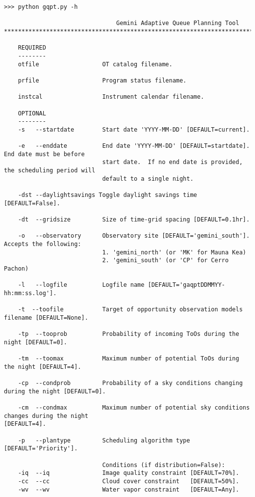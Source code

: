 \documentclass{article}
\begin{document}
\begin{lstlisting}
>>> python gqpt.py -h

                                Gemini Adaptive Queue Planning Tool
*****************************************************************************************************               

    REQUIRED
    --------
    otfile                  OT catalog filename.

    prfile                  Program status filename.

    instcal                 Instrument calendar filename.

    OPTIONAL
    --------
    -s   --startdate        Start date 'YYYY-MM-DD' [DEFAULT=current].

    -e   --enddate          End date 'YYYY-MM-DD' [DEFAULT=startdate]. End date must be before
                            start date.  If no end date is provided, the scheduling period will
                            default to a single night.

    -dst --daylightsavings Toggle daylight savings time [DEFAULT=False].

    -dt  --gridsize         Size of time-grid spacing [DEFAULT=0.1hr].

    -o   --observatory      Observatory site [DEFAULT='gemini_south']. Accepts the following:
                            1. 'gemini_north' (or 'MK' for Mauna Kea)
                            2. 'gemini_south' (or 'CP' for Cerro Pachon)

    -l   --logfile          Logfile name [DEFAULT='gaqptDDMMYY-hh:mm:ss.log'].

    -t  --toofile           Target of opportunity observation models filename [DEFAULT=None].

    -tp  --tooprob          Probability of incoming ToOs during the night [DEFAULT=0].

    -tm  --toomax           Maximum number of potential ToOs during the night [DEFAULT=4].

    -cp  --condprob         Probability of a sky conditions changing during the night [DEFAULT=0].

    -cm  --condmax          Maximum number of potential sky conditions changes during the night 										 [DEFAULT=4].  

    -p   --plantype         Scheduling algorithm type [DEFAULT='Priority']. 

                            Conditions (if distribution=False):
    -iq  --iq               Image quality constraint [DEFAULT=70%].
    -cc  --cc               Cloud cover constraint   [DEFAULT=50%].
    -wv  --wv               Water vapor constraint   [DEFAULT=Any].


\end{lstlisting}
\end{document}
